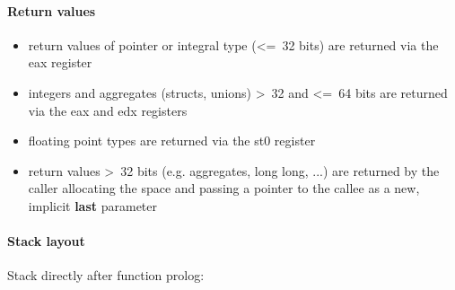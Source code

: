 \pagebreak

\paragraph{Return values}

\begin{itemize}
\item return values of pointer or integral type (\textless=\ 32 bits) are returned via the eax register
\item integers and aggregates (structs, unions) \textgreater\ 32 and \textless=\ 64 bits are returned via the eax and edx registers
\item floating point types are returned via the st0 register
\item return values \textgreater\ 32 bits (e.g. aggregates, long long, ...) are returned by the caller allocating the space and
passing a pointer to the callee as a new, implicit {\bf last} parameter
\end{itemize}



\paragraph{Stack layout}

Stack directly after function prolog:\\

